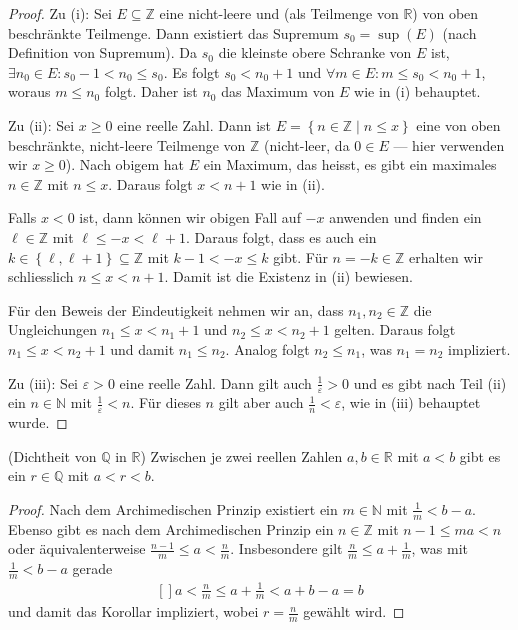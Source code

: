 \documentclass[../Analysis1_script.tex]{subfiles}
\begin{document}
\begin{proof}
	Zu (i): Sei $E \subseteq \mathbb {Z}$ eine nicht-leere und (als Teilmenge von $\mathbb {R}$) von oben beschränkte Teilmenge. Dann existiert das Supremum $s_0 = \sup (E)$ (nach Definition von Supremum). Da $s_0$ die kleinste obere Schranke von $E$ ist, $\exists n_0 \in E : s_0-1 < n_0 \leq s_0$. Es folgt $s_0 < n_0 +1$ und $\forall m \in E : m \leq s_0 < n_0 +1$, woraus $m \leq n_0$ folgt. Daher ist $n_0$ das Maximum von $E$ wie in (i) behauptet.
	
	Zu (ii): Sei $x \geq 0$ eine reelle Zahl. Dann ist $E = \left \lbrace {n \in \mathbb {Z}} \mid {n \leq x}\right \rbrace$ eine von oben beschränkte, nicht-leere Teilmenge von $\mathbb {Z}$ (nicht-leer, da $0 \in E$ — hier verwenden wir $x\geq 0$). Nach obigem hat $E$ ein Maximum, das heisst, es gibt ein maximales $n \in \mathbb {Z}$ mit $n \leq x$. Daraus folgt $x < n+1$ wie in (ii).
	
	Falls $x < 0$ ist, dann können wir obigen Fall auf $-x$ anwenden und finden ein $\ell \in \mathbb {Z}$ mit $\ell \leq -x < \ell +1$. Daraus folgt, dass es auch ein $k \in \left \lbrace {\ell ,\ell +1} \right \rbrace \subseteq \mathbb {Z}$ mit $k-1 < -x \leq k$ gibt. Für $n = -k \in \mathbb {Z}$ erhalten wir schliesslich $n \leq x < n+1$. Damit ist die Existenz in (ii) bewiesen.
	
	Für den Beweis der Eindeutigkeit nehmen wir an, dass $n_1,n_2\in \mathbb {Z}$ die Ungleichungen $n_1 \leq x < n_1+1$ und $n_2 \leq x < n_2+1$ gelten. Daraus folgt $n_1 \leq x < n_2+1$ und damit $n_1 \leq n_2$. Analog folgt $n_2 \leq n_1$, was $n_1 = n_2$ impliziert.
	
	Zu (iii): Sei $\varepsilon > 0$ eine reelle Zahl. Dann gilt auch $\frac {1}{\varepsilon }>0$ und es gibt nach Teil (ii) ein $n \in \mathbb {N}$ mit $\frac {1}{\varepsilon }<n$. Für dieses $n$ gilt aber auch $\frac {1}{n} < \varepsilon$, wie in (iii) behauptet wurde.
\end{proof}

\begin{corollary}{(Dichtheit von $\mathbb{Q}$ in $\mathbb{R}$)}
	Zwischen je zwei reellen Zahlen $a,b\in \mathbb {R}$ mit $a < b$ gibt es ein $r\in \mathbb {Q}$ mit $a < r < b$. 
\end{corollary}

\begin{proof}
	Nach dem Archimedischen Prinzip existiert ein $m \in \mathbb {N}$ mit $\frac {1}{m} < b-a$. Ebenso gibt es nach dem Archimedischen Prinzip ein $n \in \mathbb {Z}$ mit $n-1 \leq ma < n$ oder äquivalenterweise $\frac {n-1}{m}\leq a < \frac {n}{m}$. Insbesondere gilt $\frac {n}{m} \leq a + \frac {1}{m}$, was mit $\frac {1}{m} < b-a$ gerade
	\[\begin{aligned}[]
		a < \frac {n}{m} \leq a + \frac {1}{m} < a + b-a = b
	\end{aligned}\]
und damit das Korollar impliziert, wobei $r = \frac {n}{m}$ gewählt wird. 
\end{proof}
\end{document}
